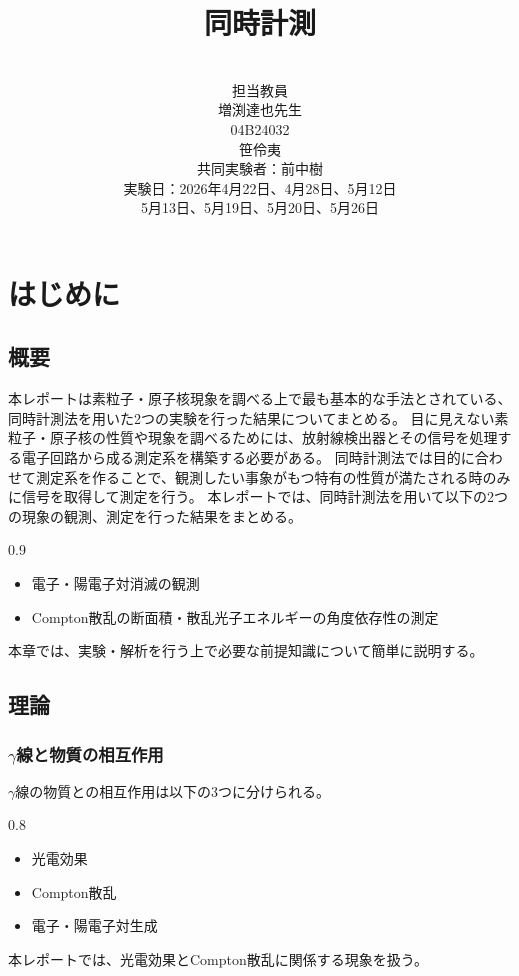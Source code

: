 \documentclass[11pt, titlepage, openany]{ltjsbook}
\title{\huge{同時計測}}
\author{\vspace{3cm}\\
\Large{担当教員}\\
\vspace{2cm}\Large{増渕達也先生}\\
\Large{04B24032}\\
\Large{笹伶夷}\\
\vspace{2cm}\Large{共同実験者：前中樹}\\
\Large{実験日：2026年4月22日、4月28日、5月12日}\\
\Large{5月13日、5月19日、5月20日、5月26日}
}
\date{}
\begin{document}
\maketitle
\tableofcontents
\clearpage

\chapter{はじめに}
\section{概要}
本レポートは素粒子・原子核現象を調べる上で最も基本的な手法とされている、同時計測法を用いた2つの実験を行った結果についてまとめる。
目に見えない素粒子・原子核の性質や現象を調べるためには、放射線検出器とその信号を処理する電子回路から成る測定系を構築する必要がある。
同時計測法では目的に合わせて測定系を作ることで、観測したい事象がもつ特有の性質が満たされる時のみに信号を取得して測定を行う。
本レポートでは、同時計測法を用いて以下の2つの現象の観測、測定を行った結果をまとめる。
\begin{center}
    \begin{varwidth}{0.9\textwidth}
        \begin{itemize}
            \item 電子・陽電子対消滅の観測
            \item Compton散乱の断面積・散乱光子エネルギーの角度依存性の測定
        \end{itemize}
    \end{varwidth}
\end{center}
本章では、実験・解析を行う上で必要な前提知識について簡単に説明する。
\section{理論}
\subsection{$\gamma$線と物質の相互作用}
$\gamma$線の物質との相互作用は以下の3つに分けられる。
\begin{center}
    \begin{varwidth}{0.8\textwidth}
        \begin{itemize}
            \item 光電効果
            \item Compton散乱
            \item 電子・陽電子対生成
        \end{itemize}
    \end{varwidth}
\end{center}
本レポートでは、光電効果とCompton散乱に関係する現象を扱う。
\end{document}
